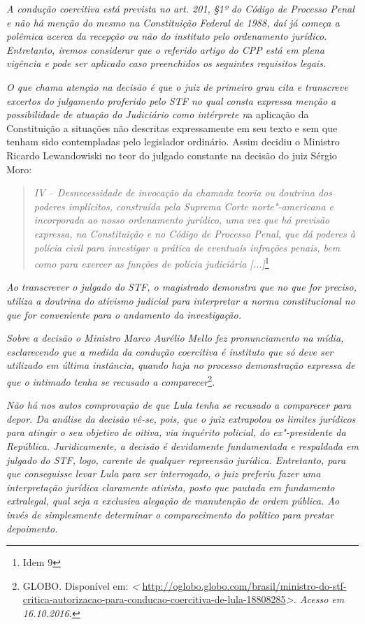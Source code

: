 {\emph{A condução coercitiva está prevista no art. 201, §1º do Código de
Processo Penal e não há menção do mesmo na Constituição Federal de 1988,
daí já começa a polêmica acerca da recepção ou não do instituto pelo
ordenamento jurídico. Entretanto, iremos considerar que o referido
artigo do CPP está em plena vigência e pode ser aplicado caso
preenchidos os seguintes requisitos legais. }

\emph{O que chama atenção na decisão é que o juiz de primeiro grau cita
e transcreve excertos do julgamento proferido pelo STF no qual consta
expressa menção a possibilidade de atuação do Judiciário como intérprete
n}a aplicação da Constituição a situações não descritas expressamente em
seu texto e sem que tenham sido contempladas pelo legislador ordinário.
Assim decidiu o Ministro Ricardo Lewandowiski no teor do julgado
constante na decisão do juiz Sérgio Moro:

\begin{quote}
\emph{IV -- Desnecessidade de invocação da chamada teoria ou doutrina
dos poderes implícitos, construída pela Suprema Corte norte"-americana e
incorporada ao nosso ordenamento jurídico, uma vez que há previsão
expressa, na Constituição e no Código de Processo Penal, que dá poderes
à polícia civil para investigar a prática de eventuais infrações penais,
bem como para exercer as funções de polícia judiciária
{[}...{]}}\footnote{Idem 9}
\end{quote}

\emph{Ao transcrever o julgado do STF, o magistrado demonstra que no que
for preciso, utiliza a doutrina do ativismo judicial para interpretar a
norma constitucional no que for conveniente para o andamento da
investigação. }

\emph{Sobre a decisão o Ministro Marco Aurélio Mello fez pronunciamento
na mídia, esclarecendo que a medida da condução coercitiva é instituto
que só deve ser utilizado em última instância, quando haja no processo
demonstração expressa de que o intimado tenha se recusado a
comparecer}\footnote{GLOBO. Disponível em: \emph{\textless{}}
  \href{http://oglobo.globo.com/brasil/ministro-do-stf-critica-autorizacao-para-conducao-coercitiva-de-lula-18808285}{{http://oglobo.globo.com/brasil/ministro-do-stf-critica-autorizacao-para-conducao-coercitiva-de-lula-18808285}}\emph{\textgreater{}.
  Acesso em 16.10.2016.}}\emph{.}

\emph{Não há nos autos comprovação de que Lula tenha se recusado a
comparecer para depor. Da análise da decisão vê-se, pois, que o juiz
extrapolou os limites jurídicos para atingir o seu objetivo de oitiva,
via inquérito policial, do ex"-presidente da República. Juridicamente, a
decisão é devidamente fundamentada e respaldada em julgado do STF, logo,
carente de qualquer repreensão jurídica. Entretanto, para que
conseguisse levar Lula para ser interrogado, o juiz preferiu fazer uma
interpretação jurídica claramente ativista, posto que pautada em
fundamento extralegal, qual seja a exclusiva alegação de manutenção de
ordem pública. Ao invés de simplesmente determinar o comparecimento do
político para prestar depoimento. }

}

